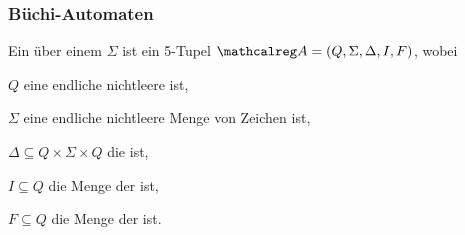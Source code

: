     \begin{frame}
      \frametitle{Büchi-Automaten}

      \begin{Definition}
        Ein 
        über einem  $\Sigma$ ist ein 5-$\!$Tupel
        $\Aut{A} = (Q, \Sigma, \Delta, I, F)$, wobei
        \begin{Itemize}
          \item
            $Q$ eine endliche nichtleere  ist,
          \item
            $\Sigma$ eine endliche nichtleere Menge von Zeichen ist,
          \item
            $\Delta \subseteq Q \times \Sigma \times Q$ die  ist,
          \item
            $I \subseteq Q$ die Menge der  ist,
          \item
            $F \subseteq Q$ die Menge der  ist.
        \end{Itemize}
      \end{Definition}

      \par\bigskip
      
    \end{frame}

